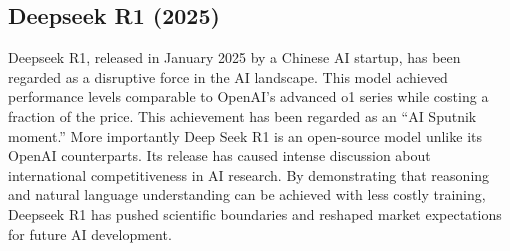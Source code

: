 \documentclass[11pt,twoside]{article}
\begin{document}
\subsection{Deepseek R1 (2025)}
Deepseek R1, released in January 2025 by a Chinese AI startup, has been regarded as a disruptive force in the AI landscape. This model achieved performance levels comparable to OpenAI’s advanced o1 series while costing a fraction of the price. This achievement has been regarded as an “AI Sputnik moment.” More importantly Deep Seek R1 is an open-source model unlike its OpenAI counterparts. Its release has caused intense discussion about international competitiveness in AI research. By demonstrating that reasoning and natural language understanding can be achieved with less costly training, Deepseek R1 has pushed scientific boundaries and reshaped market expectations for future AI development.
\end{document}
